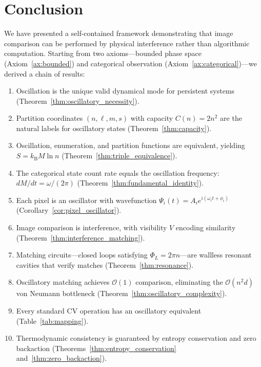 \documentclass[11pt,twocolumn,a4paper]{article}
\newcommand{\kb}{k_{\mathrm{B}}}
\newcommand{\BigO}{\mathcal{O}}
\begin{document}
\section{Conclusion}\label{sec:conclusion}

We have presented a self-contained framework demonstrating that image comparison can be performed by physical interference rather than algorithmic computation. Starting from two axioms---bounded phase space (Axiom~\ref{ax:bounded}) and categorical observation (Axiom~\ref{ax:categorical})---we derived a chain of results:

\begin{enumerate}[label=(\arabic*)]
    \item Oscillation is the unique valid dynamical mode for persistent systems (Theorem~\ref{thm:oscillatory_necessity}).
    \item Partition coordinates $(n, \ell, m, s)$ with capacity $C(n) = 2n^2$ are the natural labels for oscillatory states (Theorem~\ref{thm:capacity}).
    \item Oscillation, enumeration, and partition functions are equivalent, yielding $S = \kb M \ln n$ (Theorem~\ref{thm:triple_equivalence}).
    \item The categorical state count rate equals the oscillation frequency: $dM/dt = \omega/(2\pi)$ (Theorem~\ref{thm:fundamental_identity}).
    \item Each pixel is an oscillator with wavefunction $\Psi_i(t) = A_i e^{i(\omega_i t + \phi_i)}$ (Corollary~\ref{cor:pixel_oscillator}).
    \item Image comparison is interference, with visibility $V$ encoding similarity (Theorem~\ref{thm:interference_matching}).
    \item Matching circuits---closed loops satisfying $\Phi_L = 2\pi n$---are wallless resonant cavities that verify matches (Theorem~\ref{thm:resonance}).
    \item Oscillatory matching achieves $\BigO(1)$ comparison, eliminating the $\BigO(n^2 d)$ von Neumann bottleneck (Theorem~\ref{thm:oscillatory_complexity}).
    \item Every standard CV operation has an oscillatory equivalent (Table~\ref{tab:mapping}).
    \item Thermodynamic consistency is guaranteed by entropy conservation and zero backaction (Theorems~\ref{thm:entropy_conservation} and~\ref{thm:zero_backaction}).
\end{enumerate}
\end{document}
